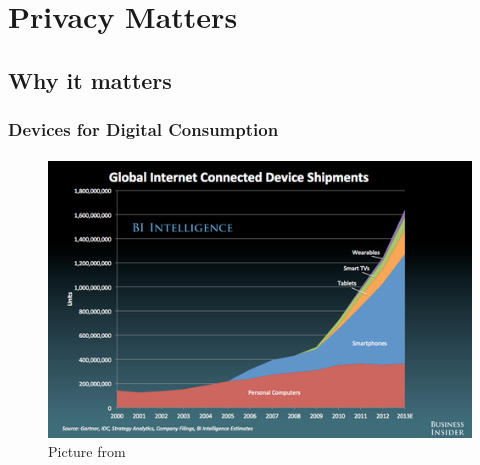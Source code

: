 % 
\section{Privacy Matters}
\subsection{Why it matters}
	\begin{frame}
	\frametitle{Devices for Digital Consumption}
	\framesubtitle{}
	        \begin{figure}[h]
                \centering
                \includegraphics[width=.8\textwidth]{../pics/globalIOTDeviceShipments}
		\caption{Picture from \href{http://blog.kanyi.me/post/66994307568/contrarian-thinking-mobile-vs-pc-in-emerging}{\cite{kanyi}}}
        	\end{figure}
	\end{frame}

